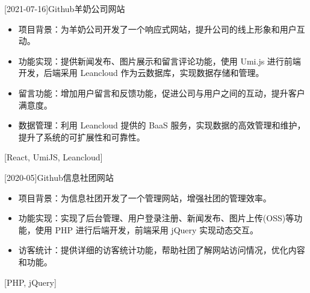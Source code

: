 \documentclass[zh]{resume}
\begin{document}
\begin{projects}
  \separator{0.5ex}
  [2021-07-16]{Github}{}{羊奶公司网站}{
    \begin{itemize}
      \item 项目背景：为羊奶公司开发了一个响应式网站，提升公司的线上形象和用户互动。
      \item 功能实现：提供新闻发布、图片展示和留言评论功能，使用 Umi.js 进行前端开发，后端采用 Leancloud 作为云数据库，实现数据存储和管理。
      \item 留言功能：增加用户留言和反馈功能，促进公司与用户之间的互动，提升客户满意度。
      \item 数据管理：利用 Leancloud 提供的 BaaS 服务，实现数据的高效管理和维护，提升了系统的可扩展性和可靠性。
    \end{itemize}
  }[React, UmiJS, Leancloud]

  \separator{0.5ex}
  [2020-05]{Github}{}{信息社团网站}{
    \begin{itemize}
      \item 项目背景：为信息社团开发了一个管理网站，增强社团的管理效率。
      \item 功能实现：实现了后台管理、用户登录注册、新闻发布、图片上传(OSS)等功能，使用 PHP 进行后端开发，前端采用 jQuery 实现动态交互。
      \item 访客统计：提供详细的访客统计功能，帮助社团了解网站访问情况，优化内容和功能。
    \end{itemize}
  }[PHP, jQuery]

\end{projects}
\end{document}
